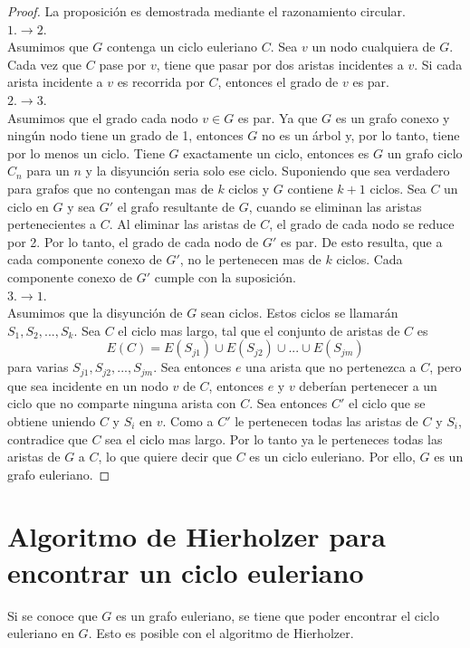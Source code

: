 \documentclass[12pt]{article}
\begin{document}
\begin{proof}
La proposición es demostrada mediante el razonamiento circular.
\\$1. \rightarrow 2.$
\\Asumimos que $G$ contenga un ciclo euleriano $C$. Sea $v$ un nodo cualquiera de $G$. Cada vez que $C$ pase por $v$, tiene que pasar por dos aristas incidentes a $v$. Si cada arista incidente a $v$ es recorrida por $C$, entonces el grado de $v$ es par.
\\$2. \rightarrow 3.$
\\Asumimos que el grado cada nodo $v \in G$ es par. Ya que $G$ es un grafo conexo y ningún nodo tiene un grado de 1, entonces $G$ no es un árbol y, por lo tanto, tiene por lo menos un ciclo. Tiene $G$ exactamente un ciclo, entonces es $G$ un grafo ciclo $C_{n}$ para un $n$ y la disyunción seria solo ese ciclo. Suponiendo que sea verdadero para grafos que no contengan mas de $k$ ciclos y $G$ contiene $k+1$ ciclos. Sea $C$ un ciclo en $G$ y sea $G'$ el grafo resultante de $G$, cuando se eliminan las aristas pertenecientes a $C$. Al eliminar las aristas de $C$, el grado de cada nodo se reduce por 2. Por lo tanto, el grado de cada nodo de $G'$ es par. De esto resulta, que a cada componente conexo de $G'$, no le pertenecen mas de $k$ ciclos. Cada componente conexo de $G'$ cumple con la suposición.
\\$3. \rightarrow 1.$
\\Asumimos que la disyunción de $G$ sean ciclos. Estos ciclos se llamarán $S_{1}, S_{2}, ..., S_{k}$. Sea $C$ el ciclo mas largo, tal que el conjunto de aristas de $C$ es $$E(C)=E(S_{j1}) \cup E(S_{j2}) \cup ... \cup E(S_{jm})$$ para varias $S_{j1}, S_{j2}, ..., S_{jm}$. Sea entonces $e$ una arista que no pertenezca a $C$, pero que sea incidente en un nodo $v$ de $C$, entonces $e$ y $v$ deberían pertenecer a un ciclo que no comparte ninguna arista con $C$. Sea entonces $C'$ el ciclo que se obtiene uniendo $C$ y $S_{i}$ en $v$. Como a $C'$ le pertenecen todas las aristas de $C$ y $S_{i}$, contradice que $C$ sea el ciclo mas largo. Por lo tanto ya le perteneces todas las aristas de $G$ a $C$, lo que quiere decir que $C$ es un ciclo euleriano. Por ello, $G$ es un grafo euleriano.
\end{proof}
\section{Algoritmo de Hierholzer para encontrar un ciclo euleriano}
Si se conoce que $G$ es un grafo euleriano, se tiene que poder encontrar el ciclo euleriano en $G$. Esto es posible con el algoritmo de Hierholzer.
\end{document}
